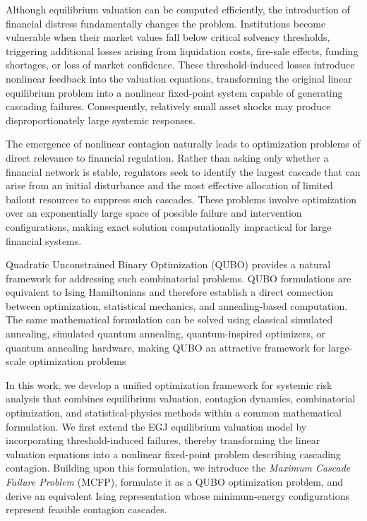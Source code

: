 \documentclass[aps,reprint,superscriptaddress,pra]{revtex4-2}
\begin{document}
Although equilibrium valuation can be computed efficiently, the introduction of financial distress fundamentally changes the problem. Institutions become vulnerable when their market values fall below critical solvency thresholds, triggering additional losses arising from liquidation costs, fire-sale effects, funding shortages, or loss of market confidence. These threshold-induced losses introduce nonlinear feedback into the valuation equations, transforming the original linear equilibrium problem into a nonlinear fixed-point system capable of generating cascading failures. Consequently, relatively small asset shocks may produce disproportionately large systemic responses.

The emergence of nonlinear contagion naturally leads to optimization problems of direct relevance to financial regulation. Rather than asking only whether a financial network is stable, regulators seek to identify the largest cascade that can arise from an initial disturbance and the most effective allocation of limited bailout resources to suppress such cascades. These problems involve optimization over an exponentially large space of possible failure and intervention configurations, making exact solution computationally impractical for large financial systems.

Quadratic Unconstrained Binary Optimization (QUBO) provides a natural framework for addressing such combinatorial problems. QUBO formulations are equivalent to Ising Hamiltonians and therefore establish a direct connection between optimization, statistical mechanics, and annealing-based computation. The same mathematical formulation can be solved using classical simulated annealing, simulated quantum annealing, quantum-inspired optimizers, or quantum annealing hardware, making QUBO an attractive framework for large-scale optimization problems~\cite{kirkpatrick1983optimization,kadowaki1998quantum,johnson2011quantum}

In this work, we develop a unified optimization framework for systemic risk analysis that combines equilibrium valuation, contagion dynamics, combinatorial optimization, and statistical-physics methods within a common mathematical formulation. We first extend the EGJ equilibrium valuation model by incorporating threshold-induced failures, thereby transforming the linear valuation equations into a nonlinear fixed-point problem describing cascading contagion. Building upon this formulation, we introduce the \emph{Maximum Cascade Failure Problem} (MCFP), formulate it as a QUBO optimization problem, and derive an equivalent Ising representation whose minimum-energy configurations represent feasible contagion cascades.
\end{document}
